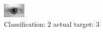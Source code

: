 \begin{figure}[h!]
\begin{center}
\includegraphics[width=0.60\columnwidth]{figures/ID633_class_2_target_3.png}
\end{center}
\caption{ Classification: 2 actual target: 3}
\label{fig:ID633_class_2_target_3}
\end{figure}
